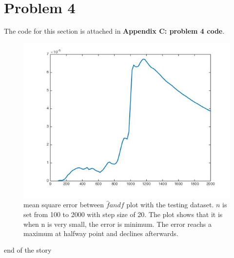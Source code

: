 \documentclass[twoside]{article}
\theoremstyle{definition}
\theoremstyle{definition}
\theoremstyle{remark}
\begin{document}
\section{Problem 4}
The code for this section is attached in \textbf{Appendix C: problem 4 code}. 
\begin{figure}[H]
\centering
\includegraphics[width=120mm]{approxErr.jpg}
\caption{ mean square error between $\hat f and f$ plot with the testing dataset. $n$ is set from 100 to 2000 with step size of 20. The plot shows that it is when n is very small, the error is minimum. The error reachs a maximum at halfway point and declines afterwards.  \label{problem2Pic6}}
\end{figure}


 
end of the story
\end{document}
